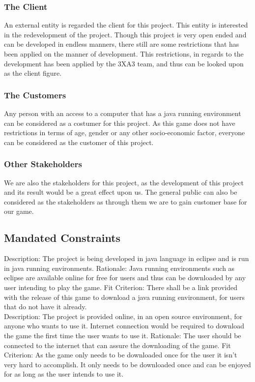 \documentclass[12pt,letterpaper]{article}
\begin{document}
	\subsubsection{The Client}
	An external entity is regarded the client for this project. This entity is interested in the redevelopment of the project. Though this project is very open ended and can be developed in endless manners, there still are some restrictions that has been applied on the manner of development. This restrictions, in regards to the development has been applied by the 3XA3 team, and thus can be looked upon as the client figure.\\
			
	\subsubsection{The Customers}
	Any person with an access to a computer that has a java running environment can be considered as a costumer for this project. As this game does not have restrictions in terms of age, gender or any other socio-economic factor, everyone can be considered as the customer of this project.\\
	\subsubsection{Other Stakeholders}
	We are also the stakeholders for this project, as the development of this project and its result would be a great effect upon us. The general public can also be considered as the stakeholders as through them we are to gain customer base for our game.
	
	\subsection{Mandated Constraints}
	Description: The project is being developed in java language in eclipse and is run in java running environments.
Rationale: Java running environments such as eclipse are available online for free for users and thus can be downloaded by any user intending to play the game.
Fit Criterion: There shall be a link provided with the release of this game to download a java running environment, for users that do not have it already.\\
\noindent Description: The project is provided online, in an open source environment, for anyone who wants to use it. Internet connection would be required to download the game the first time the user wants to use it.
Rationale: The user should be connected to the internet that can assure the downloading of the game.
Fit Criterion: As the game only needs to be downloaded once for the user it isn’t very hard to accomplish. It only needs to be downloaded once and can be enjoyed for as long as the user intends to use it.
	
\end{document}
